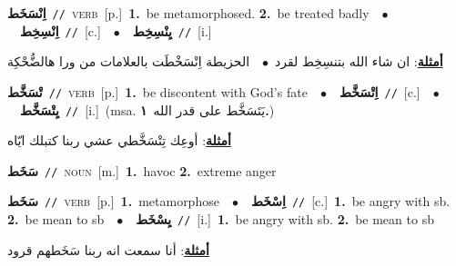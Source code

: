 \documentclass[10pt,a4paper,twoside]{article} %
\begin{document}
\begin{multicols}{2}
{\setlength\topsep{0pt}\textbf{\foreignlanguage{arabic}{اِنْسَخَط}}\ {\color{gray}\texttt{//}\color{black}}\ \textsc{verb}\ [p.]\ \textbf{1.}~be metamorphosed.  \textbf{2.}~be treated badly\ \ $\bullet$\ \ \setlength\topsep{0pt}\textbf{\foreignlanguage{arabic}{اِنْسِخِط}}\ {\color{gray}\texttt{//}\color{black}}\ [c.]\ \ $\bullet$\ \ \setlength\topsep{0pt}\textbf{\foreignlanguage{arabic}{يِنْسِخِط}}\ {\color{gray}\texttt{//}\color{black}}\ [i.]\  \begin{flushright}\color{gray}\foreignlanguage{arabic}{\textbf{\underline{\foreignlanguage{arabic}{أمثلة}}}: ان شاء الله بتنسِخِط لقرد\ $\bullet$\ \  الحزيطة اِنْسَخْطَت بالعلامات من ورا هالضُّحْكِة}\end{flushright}\color{black}} \vspace{2mm}

{\setlength\topsep{0pt}\textbf{\foreignlanguage{arabic}{تْسَخَّط}}\ {\color{gray}\texttt{//}\color{black}}\ \textsc{verb}\ [p.]\ \textbf{1.}~be discontent with God's fate\ \ $\bullet$\ \ \setlength\topsep{0pt}\textbf{\foreignlanguage{arabic}{اِتْسَخَّط}}\ {\color{gray}\texttt{//}\color{black}}\ [c.]\ \ $\bullet$\ \ \setlength\topsep{0pt}\textbf{\foreignlanguage{arabic}{يِتْسَخَّط}}\ {\color{gray}\texttt{//}\color{black}}\ [i.]\ \color{gray}(msa. \foreignlanguage{arabic}{يَتَسَخَّط على قدر الله}~\foreignlanguage{arabic}{\textbf{١.}})\color{black}\  \begin{flushright}\color{gray}\foreignlanguage{arabic}{\textbf{\underline{\foreignlanguage{arabic}{أمثلة}}}: أوعِك تِتْسَخَّطي عشي ربنا كتبلك ايّاه}\end{flushright}\color{black}} \vspace{2mm}

{\setlength\topsep{0pt}\textbf{\foreignlanguage{arabic}{سَخَط}}\ {\color{gray}\texttt{//}\color{black}}\ \textsc{noun}\ [m.]\ \textbf{1.}~havoc  \textbf{2.}~extreme anger\ } \vspace{2mm}

{\setlength\topsep{0pt}\textbf{\foreignlanguage{arabic}{سَخَط}}\ {\color{gray}\texttt{//}\color{black}}\ \textsc{verb}\ [p.]\ \textbf{1.}~metamorphose\ \ $\bullet$\ \ \setlength\topsep{0pt}\textbf{\foreignlanguage{arabic}{اِسْخَط}}\ {\color{gray}\texttt{//}\color{black}}\ [c.]\ \textbf{1.}~be angry with sb.  \textbf{2.}~be mean to sb\ \ $\bullet$\ \ \setlength\topsep{0pt}\textbf{\foreignlanguage{arabic}{يِسْخَط}}\ {\color{gray}\texttt{//}\color{black}}\ [i.]\ \textbf{1.}~be angry with sb.  \textbf{2.}~be mean to sb\  \begin{flushright}\color{gray}\foreignlanguage{arabic}{\textbf{\underline{\foreignlanguage{arabic}{أمثلة}}}: أنا سمعت انه ربنا سَخَطهم قرود}\end{flushright}\color{black}} \vspace{2mm}


\end{multicols}
\end{document}
